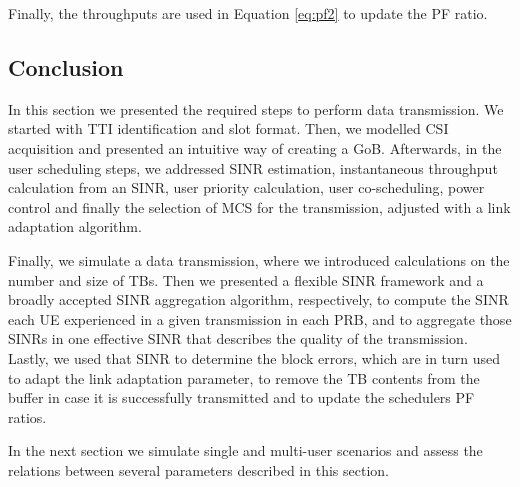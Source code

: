 Finally, the throughputs are used in Equation \eqref{eq:pf2} to update the PF ratio.

\subsection*{Conclusion}

In this section we presented the required steps to perform data transmission. We started with TTI identification and slot format. Then, we modelled CSI acquisition and presented an intuitive way of creating a \ac{GoB}. Afterwards, in the user scheduling steps, we addressed SINR estimation, instantaneous throughput calculation from an SINR, user priority calculation, user co-scheduling, power control and finally the selection of MCS for the transmission, adjusted with a link adaptation algorithm.

Finally, we simulate a data transmission, where we introduced calculations on the number and size of TBs. Then we presented a flexible SINR framework and a broadly accepted SINR aggregation algorithm, respectively, to compute the SINR each UE experienced in a given transmission in each PRB, and to aggregate those SINRs in one effective SINR that describes the quality of the transmission. Lastly, we used that SINR to determine the block errors, which are in turn used to adapt the link adaptation parameter, to remove the TB contents from the buffer in case it is successfully transmitted and to update the schedulers PF ratios.

In the next section we simulate single and multi-user scenarios and assess the relations between several parameters described in this section. 

